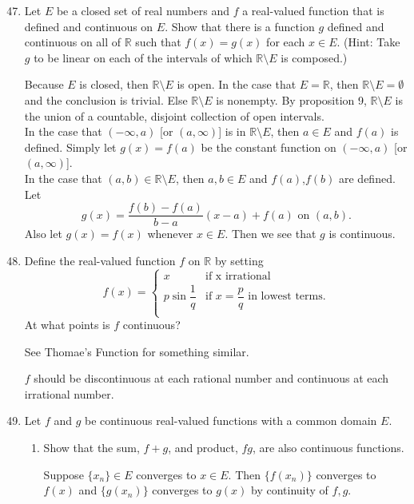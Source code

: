 \begin{enumerate}
	\setcounter{enumi}{46}
	\item Let $E$ be a closed set of real numbers and $f$ a real-valued function that is defined and continuous on $E$. Show that there is a function $g$ defined and continuous on all of $\mathbb{R}$ such that $f(x) = g(x)$ for each $x \in E$. (Hint: Take $g$ to be linear on each of the intervals of which $\mathbb{R} \setminus E$ is composed.)\par
	Because $E$ is closed, then $\mathbb{R} \setminus E$ is open. 
	In the case that $E = \mathbb{R}$, then  $\mathbb{R} \setminus E = \emptyset$ and the conclusion is trivial. 
	Else $\mathbb{R} \setminus E$ is nonempty. By proposition 9, $\mathbb{R} \setminus E$ is the union of a countable, disjoint collection of open intervals.	
	\\In the case that $(-\infty,a)$ [or $(a,\infty)$] is in $\mathbb{R} \setminus E$, then $a \in E$ and $f(a)$ is defined.
	Simply let $g(x)=f(a)$ be the constant function on $(-\infty,a)$ [or $(a,\infty)$].
	\\In the case that $(a,b) \in \mathbb{R} \setminus E$, then $a,b\in E$ and $f(a)$,$f(b)$ are defined.
	Let 
	\[
		g(x)=\frac{f(b)-f(a)}{b-a}(x-a)+f(a)\text{ on } (a,b).
	\]
	Also let $g(x)=f(x)$ whenever $x\in E$. Then we see that $g$ is continuous.
	\item Define the real-valued function $f$ on $\mathbb{R}$ by setting 
	\[ 
	f(x) =
	\begin{cases} 
		x & \text{if x irrational}\\
		p \sin \dfrac{1}{q} & \text{if } x = \dfrac{p}{q} \text{ in lowest terms.} \\
	\end{cases}
	\]
	At what points is $f$ continuous?\par
	See Thomae's Function for something similar.\par
	$f$ should be discontinuous at each rational number and continuous at each irrational number.
	\item Let $f$ and $g$ be continuous real-valued functions with a common domain $E$.
	\begin{enumerate}[label=(\roman*),align=left]
        \item Show that the sum, $f+g$, and product, $fg$, are also continuous functions.\par
        Suppose $\{x_n\}\in E$ converges to $x\in E$.
        Then $\{f(x_n)\}$ converges to $f(x)$ and $\{g(x_n)\}$ converges to $g(x)$ by continuity of $f,g$.

\end{enumerate}
\end{enumerate}

